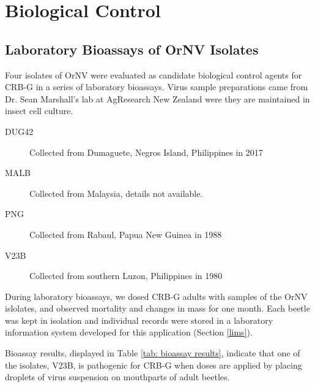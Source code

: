\documentclass[12pt,letterpaper,english,bibliography=totocnumbered,abstract=on]{scrartcl}
\begin{document}
\section{Biological Control}

\subsection{Laboratory Bioassays of OrNV Isolates}

Four isolates of OrNV were evaluated as candidate biological control agents for CRB-G in a series of laboratory bioassays. Virus sample preparations came from Dr. Sean Marshall's lab at AgResearch New Zealand were they are maintained in insect cell culture.

\begin{description}
	\item[DUG42] Collected from Dumaguete, Negros Island, Philippines in 2017
	\item[MALB] Collected from Malaysia, details not available.
	\item[PNG] Collected from Rabaul, Papua New Guinea in 1988
	\item[V23B] Collected from southern Luzon, Philippines in 1980
\end{description}

During laboratory bioassays, we dosed CRB-G adults with samples of the OrNV islolates, and observed mortality and changes in mass for one month. Each beetle was kept in isolation and individual records were stored in a laboratory information system developed for this application (Section \ref{lims}).



Bioassay results, displayed in Table \ref{tab: bioassay results}, indicate that one of the isolates, V23B, is pathogenic for CRB-G when doses are applied by placing droplets of virus suspension on mouthparts of adult beetles.
\end{document}
